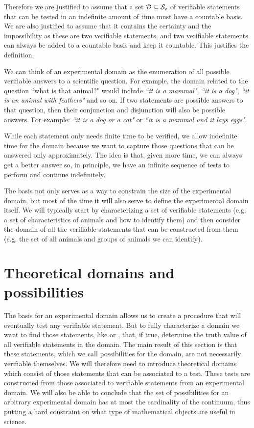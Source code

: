 \documentclass[11pt,letterpaper,fleqn]{memoir} %
\begin{document}
\begin{mathSection}
\begin{justification}
	Therefore we are justified to assume that a set $\mathcal{D} \subseteq \mathcal{S}_\textsf{v}$ of verifiable statements that can be tested in an indefinite amount of time must have a countable basis. We are also justified to assume that it contains the certainty and the impossibility as these are two verifiable statements, and two verifiable statements can always be added to a countable basis and keep it countable. This justifies the definition.
\end{justification}
\end{mathSection}

We can think of an experimental domain as the enumeration of all possible verifiable answers to a scientific question. For example, the domain related to the question ``what is that animal?" would include \emph{``it is a mammal"}, \emph{``it is a dog"}, \emph{``it is an animal with feathers"} and so on. If two statements are possible answers to that question, then their conjunction and disjunction will also be possible answers. For example: \emph{``it is a dog or a cat"} or \emph{``it is a mammal and it lays eggs"}.

While each statement only needs finite time to be verified, we allow indefinite time for the domain because we want to capture those questions that can be answered only approximately. The idea is that, given more time, we can always get a better answer so, in principle, we have an infinite sequence of tests to perform and continue indefinitely.

The basis not only serves as a way to constrain the size of the experimental domain, but most of the time it will also serve to define the experimental domain itself. We will typically start by characterizing a set of verifiable statements (e.g. a set of characteristics of animals and how to identify them) and then consider the domain of all the verifiable statements that can be constructed from them (e.g. the set of all animals and groups of animals we can identify).

\section{Theoretical domains and possibilities}

The basis for an experimental domain allows us to create a procedure that will eventually test any verifiable statement. But to fully characterize a domain we want to find those statements, like  or , that, if true, determine the truth value of all verifiable statements in the domain. The main result of this section is that these statements, which we call possibilities for the domain, are not necessarily verifiable themselves. We will therefore need to introduce theoretical domains which consist of those statements that can be associated to a test. These tests are constructed from those associated to verifiable statements from an experimental domain. We will also be able to conclude that the set of possibilities for an arbitrary experimental domain has at most the cardinality of the continuum, thus putting a hard constraint on what type of mathematical objects are useful in science.
\end{document}
